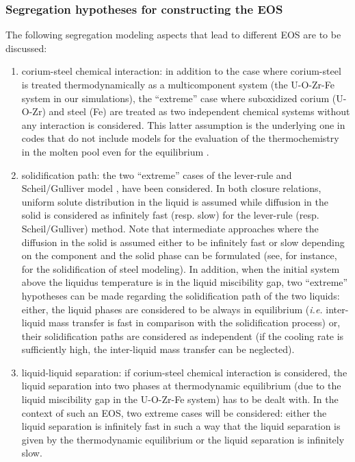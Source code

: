 \subsubsection{Segregation hypotheses for constructing the EOS} 

The following segregation modeling aspects that lead to different EOS are to be discussed:
\begin{enumerate}
 \item corium-steel chemical interaction: in addition to the case where corium-steel is treated thermodynamically as a multicomponent system (the U-O-Zr-Fe system in our simulations), the ``extreme'' case where suboxidized corium (U-O-Zr) and steel (Fe) are treated as two independent chemical systems without any interaction is considered. This latter assumption is the underlying one in codes that do not include models for the evaluation of the thermochemistry in the molten pool even for the equilibrium \cite{Carenini2019a}.
 
 \item solidification path: the two ``extreme'' cases of the lever-rule and Scheil\-/Gulliver model \cite{Scheil1942}, have been considered. In both closure relations, uniform solute distribution in the liquid is assumed while diffusion in the solid is considered as infinitely fast (resp. slow) for the lever-rule (resp. Scheil\-/Gulliver) method. Note that intermediate approaches where the diffusion in the solid is assumed either to be infinitely fast or slow depending on the component and the solid phase can be formulated (see, for instance, \cite{Chen2002,Schaffnit2015,Kozeschnik2007} for the solidification of steel modeling). In addition, when the initial system above the liquidus temperature is in the liquid miscibility gap, two ``extreme'' hypotheses can be made regarding the solidification path of the two liquids: either, the liquid phases are considered to be always in equilibrium (\textit{i.e.} inter-liquid mass transfer is fast in comparison with the solidification process) or, their solidification 
paths are considered as independent (if the cooling rate is sufficiently high, the inter-liquid mass transfer can be neglected).
 
 \item liquid-liquid separation: if corium-steel chemical interaction is considered, the liquid separation into two phases at thermodynamic equilibrium (due to the liquid miscibility gap in the U-O-Zr-Fe system) has to be dealt with. In the context of such an EOS, two extreme cases will be considered: either the liquid separation is infinitely fast in such a way that the liquid separation is given by the thermodynamic equilibrium or the liquid separation is infinitely slow.
\end{enumerate}
